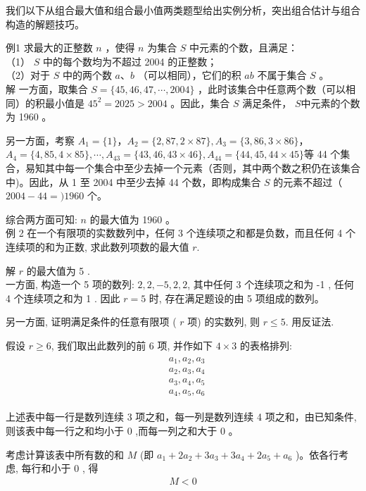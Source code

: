 \documentclass[10pt]{article}
\begin{document}
我们以下从组合最大值和组合最小值两类题型给出实例分析，突出组合估计与组合构造的解题技巧。

例1 求最大的正整数 $n$ ，使得 $n$ 为集合 $S$ 中元素的个数，且满足：\\
（1） $S$ 中的每个数均为不超过 2004 的正整数；\\
（2）对于 $S$ 中的两个数 $a 、 b$ （可以相同），它们的积 $a b$ 不属于集合 $S$ 。\\
解 一方面，取集合 $S=\{45,46,47, \cdots, 2004\}$ ，此时该集合中任意两个数（可以相同）的积最小值是 $45^{2}=2025>2004$ 。因此，集合 $S$ 满足条件， $S$中元素的个数为 1960 。

另一方面，考察 $A_{1}=\{1\} ， A_{2}=\{2,87,2 \times 87\}, A_{3}=\{3,86,3 \times 86\} ，$ $A_{4}=\{4,85,4 \times 85\}, \cdots, A_{43}=\{43,46,43 \times 46\}, A_{44}=\{44,45,44 \times 45\}$等 44 个集合，易知其中每一个集合中至少去掉一个元素（否则，其中两个数之积仍在该集合中)。因此，从 1 至 2004 中至少去掉 44 个数，即构成集合 $S$ 的元素不超过（ $2004-44=) 1960$ 个。

综合两方面可知: $n$ 的最大值为 1960 。\\
例 2 在一个有限项的实数数列中，任何 3 个连续项之和都是负数，而且任何 4 个连续项的和为正数, 求此数列项数的最大值 $r$.

解 $r$ 的最大值为 5 .\\
一方面, 构造一个 5 项的数列: $2,2,-5,2,2$, 其中任何 3 个连续项之和为 -1 , 任何 4 个连续项之和为 1 . 因此 $r=5$ 时, 存在满足题设的由 5 项组成的数列。

另一方面, 证明满足条件的任意有限项 ( $r$ 项) 的实数列, 则 $r \leqslant 5$. 用反证法.

假设 $r \geqslant 6$, 我们取出此数列的前 6 项, 并作如下 $4 \times 3$ 的表格排列:\\
\begin{align*}
\begin{aligned}
& a_{1}, a_{2}, a_{3} \\
& a_{2}, a_{3}, a_{4} \\
& a_{3}, a_{4}, a_{5} \\
& a_{4}, a_{5}, a_{6}
\end{aligned}
\end{align*}

上述表中每一行是数列连续 3 项之和，每一列是数列连续 4 项之和，由已知条件, 则该表中每一行之和均小于 0 ,而每一列之和大于 0 。

考虑计算该表中所有数的和 $M$ (即 $a_{1}+2 a_{2}+3 a_{3}+3 a_{4}+2 a_{5}+a_{6}$ )。依各行考虑, 每行和小于 0 , 得\\
\begin{align*}
M<0
\end{align*}
\end{document}
